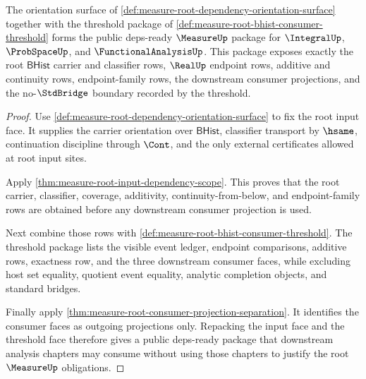 \begin{theorem}
\label{thm:measure-root-deps-ready-public-package}
The orientation surface of
\autoref{def:measure-root-dependency-orientation-surface} together with the
threshold package of \autoref{def:measure-root-bhist-consumer-threshold}
forms the public deps-ready $\MeasureUp$ package for $\IntegralUp$,
$\ProbSpaceUp$, and $\FunctionalAnalysisUp$. This package exposes exactly the
root $\mathsf{BHist}$ carrier and classifier rows, $\RealUp$ endpoint rows,
additive and continuity rows, endpoint-family rows, the downstream consumer
projections, and the no-$\StdBridge$ boundary recorded by the threshold.
\end{theorem}
\begin{proof}
Use \autoref{def:measure-root-dependency-orientation-surface} to fix the root
input face. It supplies the carrier orientation over $\mathsf{BHist}$,
classifier transport by $\hsame$, continuation discipline through $\Cont$,
and the only external certificates allowed at root input sites.

Apply \autoref{thm:measure-root-input-dependency-scope}. This proves that the
root carrier, classifier, coverage, additivity, continuity-from-below, and
endpoint-family rows are obtained before any downstream consumer projection is
used.

Next combine those rows with
\autoref{def:measure-root-bhist-consumer-threshold}. The threshold package
lists the visible event ledger, endpoint comparisons, additive rows,
exactness row, and the three downstream consumer faces, while excluding host
set equality, quotient event equality, analytic completion objects, and
standard bridges.

Finally apply
\autoref{thm:measure-root-consumer-projection-separation}. It identifies the
consumer faces as outgoing projections only. Repacking the input face and the
threshold face therefore gives a public deps-ready package that downstream
analysis chapters may consume without using those chapters to justify the
root $\MeasureUp$ obligations.
\end{proof}
